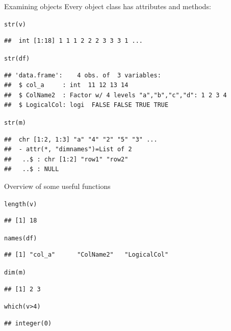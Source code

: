 \documentclass[xcolor=table,       handout,    xcolor=dvipsnames]{beamer}\usepackage[]{graphicx}\usepackage[]{color}
\makeatletter
\newcommand{\hlnum}[1]{\textcolor[rgb]{0,0,0}{#1}}
\newcommand{\hlopt}[1]{\textcolor[rgb]{0,0,0}{#1}}
\newcommand{\hlstd}[1]{\textcolor[rgb]{0,0,0}{#1}}
\newcommand{\hlkwd}[1]{\textcolor[rgb]{0,0,1}{#1}}
\newenvironment{kframe}{%
 \def\at@end@of@kframe{}%
 \ifinner\ifhmode%
  \def\at@end@of@kframe{\end{minipage}}%
  \begin{minipage}{\columnwidth}%
 \fi\fi%
 \def\FrameCommand##1{\hskip\@totalleftmargin \hskip-\fboxsep
 \colorbox{shadecolor}{##1}\hskip-\fboxsep
     \hskip-\linewidth \hskip-\@totalleftmargin \hskip\columnwidth}%
 \MakeFramed {\advance\hsize-\width
   \@totalleftmargin\z@ \linewidth\hsize
   \@setminipage}}%
 {\par\unskip\endMakeFramed%
 \at@end@of@kframe}
\newenvironment{knitrout}{}{} %
\makeatother
\begin{document}

\begin{frame}[fragile]{Examining objects}
Every object class has attributes and methods:
\begin{knitrout}\footnotesize
{}\color{fgcolor}\begin{kframe}
\begin{alltt}
\hlkwd{str}\hlstd{(v)}
\end{alltt}
\begin{verbatim}
##  int [1:18] 1 1 1 2 2 2 3 3 3 1 ...
\end{verbatim}
\begin{alltt}
\hlkwd{str}\hlstd{(df)}
\end{alltt}
\begin{verbatim}
## 'data.frame':	4 obs. of  3 variables:
##  $ col_a     : int  11 12 13 14
##  $ ColName2  : Factor w/ 4 levels "a","b","c","d": 1 2 3 4
##  $ LogicalCol: logi  FALSE FALSE TRUE TRUE
\end{verbatim}
\begin{alltt}
\hlkwd{str}\hlstd{(m)}
\end{alltt}
\begin{verbatim}
##  chr [1:2, 1:3] "a" "4" "2" "5" "3" ...
##  - attr(*, "dimnames")=List of 2
##   ..$ : chr [1:2] "row1" "row2"
##   ..$ : NULL
\end{verbatim}
\end{kframe}
\end{knitrout}
\end{frame}


\begin{frame}[fragile]{Overview of some useful functions}
\begin{knitrout}
\color{fgcolor}\begin{kframe}
\begin{alltt}
\hlkwd{length}\hlstd{(v)}
\end{alltt}
\begin{verbatim}
## [1] 18
\end{verbatim}
\begin{alltt}
\hlkwd{names}\hlstd{(df)}
\end{alltt}
\begin{verbatim}
## [1] "col_a"      "ColName2"   "LogicalCol"
\end{verbatim}
\begin{alltt}
\hlkwd{dim}\hlstd{(m)}
\end{alltt}
\begin{verbatim}
## [1] 2 3
\end{verbatim}
\begin{alltt}
\hlkwd{which}\hlstd{(v} \hlopt{>} \hlnum{4}\hlstd{)}
\end{alltt}
\begin{verbatim}
## integer(0)
\end{verbatim}
\end{kframe}
\end{knitrout}
\end{frame}
\end{document}
